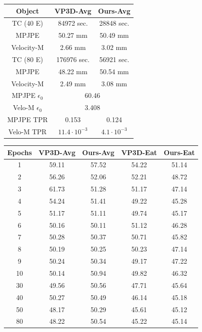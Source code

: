 \documentclass[10pt,twocolumn,letterpaper]{article}
\begin{document}
\begin{table}
\begin{minipage}[t]{.49\textwidth}
	\centering
	\begin{tabular}{ccc}
	\hline
	Object & VP3D-Avg & Ours-Avg \\
	\hline

	TC (40 E)& 84972 sec. & 28848 sec.\\
	MPJPE& 50.27 mm & 50.49 mm\\
	Velocity-M& 2.66 mm & 3.02 mm  \\
	
	\hline
	
	TC (80 E)& 176976 sec. & 56921 sec.\\
	MPJPE&  48.22 mm & 50.54 mm\\
	Velocity-M& 2.49 mm & 3.08 mm  \\
	
	\hline
	
	MPJPE $\epsilon_0$ & \multicolumn{2}{c}{60.46} \\
	Velo-M $\epsilon_0$ & \multicolumn{2}{c}{3.408} \\
	MPJPE TPR & 0.153 & 0.124 \\
	Velo-M TPR & $11.4\cdot 10^{-3}$ & $4.1\cdot 10^{-3}$ \\

	

	\hline
	\end{tabular}
\end{minipage}
\quad
\begin{minipage}[t]{.49\textwidth}
	\centering
	\begin{tabular}{ccccc}
	\hline
	Epochs & VP3D-Avg & Ours-Avg & VP3D-Eat & Ours-Eat\\
	\hline
	1 & 59.11 & 57.52 & 54.22 & 51.14 \\
	2 & 56.26 & 52.06 & 52.21 & 48.72 \\
	3 & 61.73 & 51.28 & 51.17 & 47.14 \\
	4 & 54.24 & 51.41 & 49.22 & 45.28 \\
	5 & 51.17 & 51.11 & 49.74 & 45.17\\
	6 & 50.16 & 50.11 & 51.12 & 46.28\\
	7 & 50.28 & 50.37 & 50.71 & 45.82\\
	8 & 50.19 & 50.25 & 50.23 & 47.14 \\
	9 & 50.24 & 50.34 & 49.17 & 47.22\\
	10 & 50.14 & 50.94 & 49.82 & 46.32\\
	30 & 49.56 & 50.56 & 47.71 & 45.64\\
	40 & 50.27 & 50.49 & 46.14 & 45.18\\
	50 & 48.17 & 50.29 & 45.61 & 45.12\\
	80 & 48.22 & 50.54 & 45.22 & 45.14 \\
	\hline
	\end{tabular}
\end{minipage}


\end{table}
\end{document}
